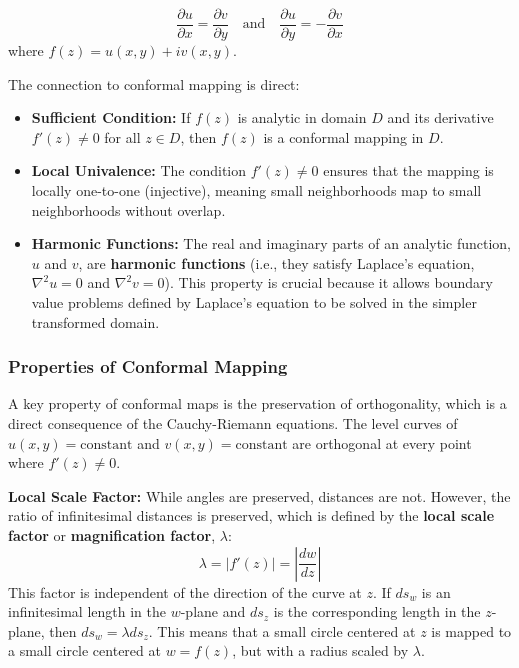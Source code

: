 \documentclass[12pt,a4paper]{article}
\begin{document}
\begin{formulabox}
\[\frac{\partial u}{\partial x} = \frac{\partial v}{\partial y} \quad \text{and} \quad \frac{\partial u}{\partial y} = -\frac{\partial v}{\partial x}\]
where \(f(z) = u(x, y) + iv(x, y)\).
\end{formulabox}

The connection to conformal mapping is direct:

\begin{definitionbox}
\begin{itemize}
\item \textbf{Sufficient Condition:} If \(f(z)\) is analytic in domain \(D\) and its derivative
\(f'(z) \neq 0\) for all \(z \in D\), then \(f(z)\) is a conformal
mapping in \(D\).
\item \textbf{Local Univalence:} The condition
\(f'(z) \neq 0\) ensures that the mapping is locally one-to-one
(injective), meaning small neighborhoods map to small neighborhoods
without overlap.
\item \textbf{Harmonic Functions:} The real and imaginary
parts of an analytic function, \(u\) and \(v\), are \textbf{harmonic
functions} (i.e., they satisfy Laplace's equation, \(\nabla^2 u = 0\)
and \(\nabla^2 v = 0\)). This property is crucial because it allows
boundary value problems defined by Laplace's equation to be solved in
the simpler transformed domain.
\end{itemize}
\end{definitionbox}

\subsubsection{Properties of Conformal
Mapping}\label{properties-of-conformal-mapping}

A key property of conformal maps is the preservation of orthogonality,
which is a direct consequence of the Cauchy-Riemann equations. The level
curves of \(u(x, y) = \text{constant}\) and
\(v(x, y) = \text{constant}\) are orthogonal at every point where
\(f'(z) \neq 0\).

\textbf{Local Scale Factor:} While angles are preserved, distances are
not. However, the ratio of infinitesimal distances is preserved, which
is defined by the \textbf{local scale factor} or \textbf{magnification
factor}, \(\lambda\): \[
\lambda = |f'(z)| = \left| \frac{dw}{dz} \right|
\] This factor is independent of the direction of the curve at \(z\). If
\(ds_w\) is an infinitesimal length in the \(w\)-plane and \(ds_z\) is
the corresponding length in the \(z\)-plane, then
\(ds_w = \lambda ds_z\). This means that a small circle centered at
\(z\) is mapped to a small circle centered at \(w=f(z)\), but with a
radius scaled by \(\lambda\).
\end{document}
